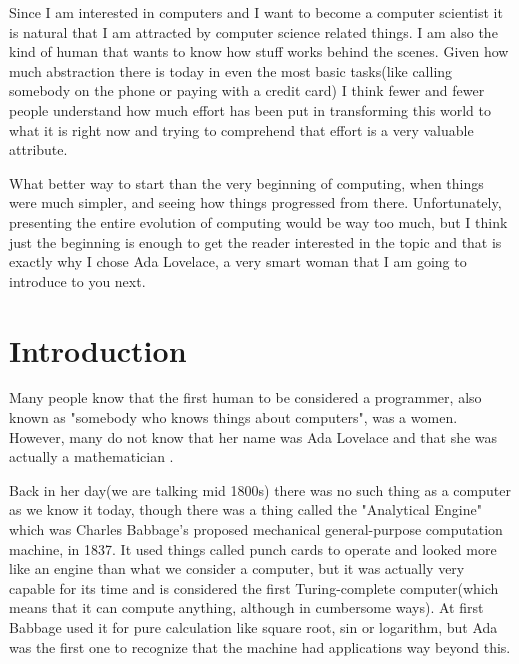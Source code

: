 \documentclass{article}
\begin{document}
\vspace{0.3cm}

Since I am interested in computers and I want to become a computer scientist it is natural that I am attracted by computer science related things. I am also the kind of human that wants to know how stuff works behind the scenes. Given how much abstraction there is today in even the most basic tasks(like calling somebody on the phone or paying with a credit card) I think fewer and fewer people understand how much effort has been put in transforming this world to what it is right now and trying to comprehend that effort is a very valuable attribute.

\vspace{0.3cm}

What better way to start than the very beginning of computing, when things were much simpler, and seeing how things progressed from there. Unfortunately, presenting the entire evolution of computing would be way too much, but I think just the beginning is enough to get the reader interested in the topic and that is exactly why I chose Ada Lovelace, a very smart woman that I am going to introduce to you next.

\newpage

\section{Introduction}

Many people know that the first human to be considered a programmer, also known as "somebody who knows things about computers", was a women. However, many do not know that her name was Ada Lovelace and that she was actually a mathematician \cite{Wikipedia}.

\vspace{0.3cm}

Back in her day(we are talking mid 1800s) there was no such thing as a computer as we know it today, though there was a thing called the "Analytical Engine" which was Charles Babbage's proposed mechanical general-purpose computation machine, in 1837. It used things called punch cards to operate and looked more like an engine than what we consider a computer, but it was actually very capable for its time and is considered the first Turing-complete computer(which means that it can compute anything, although in cumbersome ways). At first Babbage used it for pure calculation like square root, sin or logarithm, but Ada was the first one to recognize that the machine had applications way beyond this.
\end{document}
